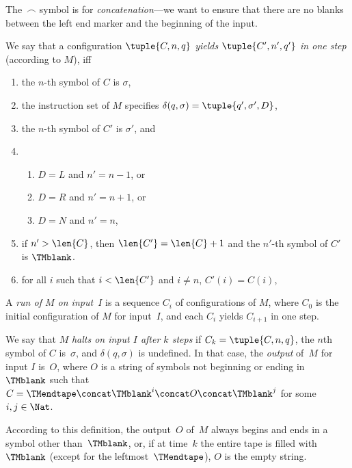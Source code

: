 \documentclass[../../../include/open-logic-section]{subfiles}
\begin{document}
\begin{explain}
The~$\frown$ symbol is for \emph{concatenation}---we want to
ensure that there are no blanks between the left end marker and
the beginning of the input.
\end{explain}

\begin{defn}
We say that a configuration $\tuple{C, n, q}$ \emph{yields
  $\tuple{C', n', q'}$ in one step} (according to $M$), iff
\begin{enumerate}
\item the $n$-th symbol of $C$ is $\sigma$,
\item the instruction set of $M$ specifies $\delta(q, \sigma) =
  \tuple{q', \sigma', D}$,
\item the $n$-th symbol of $C'$ is $\sigma'$, and 
\item
\begin{enumerate}
\item $D = L$ and $n' = n - 1$, or
\item $D = R$ and $n' = n + 1$, or
\item $D = N$ and $n' = n$,
\end{enumerate}
\item if $n' > \len{C}$, then $\len{C'} = \len{C} + 1$ and the $n'$-th
  symbol of $C'$ is $\TMblank$.
\item for all $i$ such that $i < \len{C'}$ and $i \neq n$, $C'(i) = C(i)$,
\end{enumerate}
\end{defn}

\begin{defn}
A \emph{run of $M$ on input~$I$} is a sequence $C_i$ of configurations
of $M$, where $C_0$ is the initial configuration of $M$ for input~$I$,
and each $C_i$ yields $C_{i+1}$ in one step.

We say that $M$ \emph{halts on input $I$ after $k$ steps} if $C_k =
\tuple{C, n, q}$, the $n$th symbol of $C$ is~$\sigma$, and $\delta(q,
\sigma)$ is undefined.  In that case, the \emph{output} of~$M$ for
input $I$ is~$O$, where $O$ is a string of symbols not beginning or
ending in~$\TMblank$ such that $C = \TMendtape \concat \TMblank^i
\concat O \concat \TMblank^j$ for some~$i, j \in \Nat$.
\end{defn}

\begin{explain}
According to this definition, the output~$O$ of~$M$ always begins and
ends in a symbol other than~$\TMblank$, or, if at time~$k$ the entire
tape is filled with~$\TMblank$ (except for the leftmost~$\TMendtape$),
$O$ is the empty string.
\end{explain}
\end{document}
